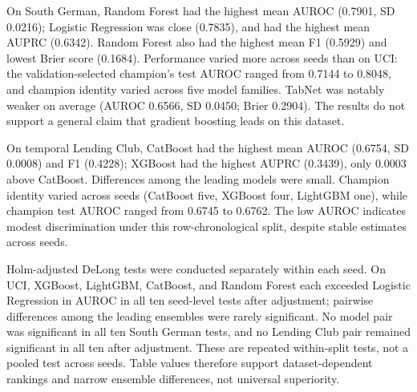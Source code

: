 \documentclass[pdflatex,sn-mathphys-num]{sn-jnl}
\begin{document}
On South German, Random Forest had the highest mean AUROC (0.7901, SD 0.0216); Logistic Regression was close (0.7835), and had the highest mean AUPRC (0.6342). Random Forest also had the highest mean F1 (0.5929) and lowest Brier score (0.1684). Performance varied more across seeds than on UCI: the validation-selected champion's test AUROC ranged from 0.7144 to 0.8048, and champion identity varied across five model families. TabNet was notably weaker on average (AUROC 0.6566, SD 0.0450; Brier 0.2904). The results do not support a general claim that gradient boosting leads on this dataset.

On temporal Lending Club, CatBoost had the highest mean AUROC (0.6754, SD 0.0008) and F1 (0.4228); XGBoost had the highest AUPRC (0.3439), only 0.0003 above CatBoost. Differences among the leading models were small. Champion identity varied across seeds (CatBoost five, XGBoost four, LightGBM one), while champion test AUROC ranged from 0.6745 to 0.6762. The low AUROC indicates modest discrimination under this row-chronological split, despite stable estimates across seeds.

Holm-adjusted DeLong tests were conducted separately within each seed. On UCI, XGBoost, LightGBM, CatBoost, and Random Forest each exceeded Logistic Regression in AUROC in all ten seed-level tests after adjustment; pairwise differences among the leading ensembles were rarely significant. No model pair was significant in all ten South German tests, and no Lending Club pair remained significant in all ten after adjustment. These are repeated within-split tests, not a pooled test across seeds. Table values therefore support dataset-dependent rankings and narrow ensemble differences, not universal superiority.
\end{document}
